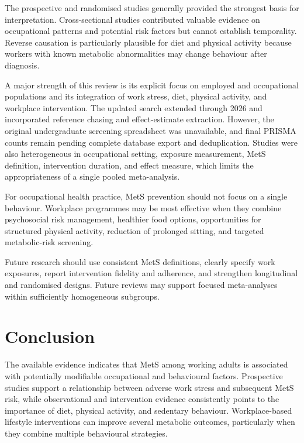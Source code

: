 \documentclass[11pt]{article}
\begin{document}
The prospective and randomised studies generally provided the strongest basis for interpretation. Cross-sectional studies contributed valuable evidence on occupational patterns and potential risk factors but cannot establish temporality. Reverse causation is particularly plausible for diet and physical activity because workers with known metabolic abnormalities may change behaviour after diagnosis.

A major strength of this review is its explicit focus on employed and occupational populations and its integration of work stress, diet, physical activity, and workplace intervention. The updated search extended through 2026 and incorporated reference chasing and effect-estimate extraction. However, the original undergraduate screening spreadsheet was unavailable, and final PRISMA counts remain pending complete database export and deduplication. Studies were also heterogeneous in occupational setting, exposure measurement, MetS definition, intervention duration, and effect measure, which limits the appropriateness of a single pooled meta-analysis.

For occupational health practice, MetS prevention should not focus on a single behaviour. Workplace programmes may be most effective when they combine psychosocial risk management, healthier food options, opportunities for structured physical activity, reduction of prolonged sitting, and targeted metabolic-risk screening.

Future research should use consistent MetS definitions, clearly specify work exposures, report intervention fidelity and adherence, and strengthen longitudinal and randomised designs. Future reviews may support focused meta-analyses within sufficiently homogeneous subgroups.

\section{Conclusion}

The available evidence indicates that MetS among working adults is associated with potentially modifiable occupational and behavioural factors. Prospective studies support a relationship between adverse work stress and subsequent MetS risk, while observational and intervention evidence consistently points to the importance of diet, physical activity, and sedentary behaviour. Workplace-based lifestyle interventions can improve several metabolic outcomes, particularly when they combine multiple behavioural strategies.
\end{document}

